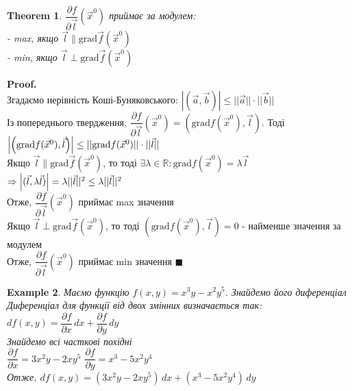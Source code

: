 \documentclass[a4paper, 14pt]{extarticle}
\theoremstyle{theoremdd}
\newtheorem{theorem}{Theorem}[subsection]
\theoremstyle{theoremdd}
\theoremstyle{theoremdd}
\theoremstyle{theoremdd}
\newtheorem{example}[theorem]{Example}
\theoremstyle{theoremdd}
\theoremstyle{theoremdd}
\theoremstyle{theoremdd}
\theoremstyle{theoremdd}
\newenvironment{pf}{\vspace*{-3mm} \textbf{Proof. \\}}{$\blacksquare$}
\def\departial#1#2{\dfrac{\partial {#1}}{\partial {#2}}}
\begin{document}
\begin{theorem}
$\dfrac{\partial f}{\partial \vec{l}}(\vec{x}^0)$ приймає за модулем:\\
- max, якщо $\vec{l} \parallel \textrm{grad} \vec{f}(\vec{x}^0)$\\
- min, якщо $\vec{l} \perp \textrm{grad} \vec{f}(\vec{x}^0)$
\end{theorem}
\begin{pf}
Згадаємо нерівність Коші-Буняковського: $|(\vec{a}, \vec{b})| \leq ||\vec{a}|| \cdot ||\vec{b}||$\\
Із попереднього твердження, $\dfrac{\partial f}{\partial \vec{l}}(\vec{x}^0) = \left( \textrm{grad} f(\vec{x}^0), \vec{l} \right)$. Тоді\\
$\abs{\left( \textrm{grad} f(\vec{x}^0), \vec{l} \right)} \leq || \textrm{grad}f(\vec{x}^0) || \cdot ||\vec{l} ||$\\
Якщо $\vec{l} \parallel \textrm{grad} \vec{f}(\vec{x}^0)$, то тоді $\exists \lambda \in \mathbb{R}: \textrm{grad} f(\vec{x}^0) = \lambda \vec{l}$\\
$\Rightarrow \abs{(\vec{l}, \lambda \vec{l})} = \lambda || \vec{l} ||^2 \leq \lambda || \vec{l} ||^2$\\
Отже, $\dfrac{\partial f}{\partial \vec{l}}(\vec{x}^0)$ приймає max значення\\
Якщо $\vec{l} \perp \textrm{grad} \vec{f}(\vec{x}^0)$, то тоді $\left(\textrm{grad} f(\vec{x}^0), \vec{l} \right) = 0$ - найменше значення за модулем\\
Отже, $\dfrac{\partial f}{\partial \vec{l}}(\vec{x}^0)$ приймає min значення
\end{pf}

\begin{example}
Маємо функцію $f(x,y) = x^3y - x^2y^5$. Знайдемо його диференціал\\
Диференціал для функції від двох змінних визначається так:\\
$df(x,y) = \departial{f}{x}\,dx + \departial{f}{y}\,dy$\\
Знайдемо всі часткові похідні\\
$\departial{f}{x} = 3x^2y - 2xy^5$ \hspace{1cm} $\departial{f}{y} = x^3 - 5x^2y^4$\\
Отже, $df(x,y) = (3x^2y - 2xy^5)\,dx + (x^3-5x^2y^4)\,dy$
\end{example}
\end{document}
